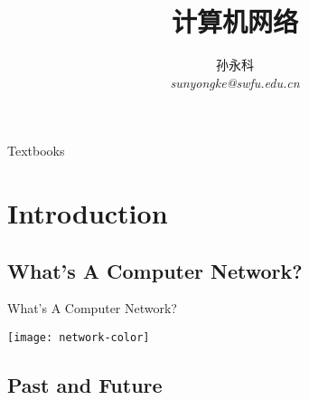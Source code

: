 \documentclass{netbeamer}
\title{计算机网络}
\author{孙永科\\{\small \emph{sunyongke@swfu.edu.cn}}}
\begin{document}
\frame{\titlepage}

\begin{frame}{Textbooks}
  \begin{refsection}
    \nocite{tanenbaum2011computer,kurose2013computer,fall2011tcp}
    \printbibliography[heading=none]
  \end{refsection}
\end{frame}

\section{Introduction}

\subsection[Definition]{What's A Computer Network?}

\begin{frame}{{What's A Computer Network?}}
  \begin{center}
    \texttt{[image: network-color]}%
  \end{center}
\end{frame}

\subsection[History]{Past and Future}
\end{document}

